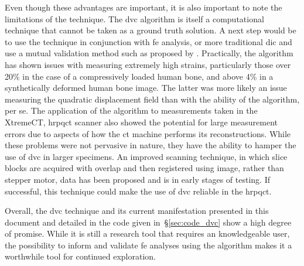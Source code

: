 Even though these advantages are important, it is also important to note the limitations of the technique.
The \ac{dvc} algorithm is itself a computational technique that cannot be taken as a ground truth solution.
A next step would be to use the technique in conjunction with \acl{fe} analysis, or more traditional \acl{dic} and use a mutual validation method such as proposed by \citet{bland_statistical_1986}.
Practically, the algorithm has shown issues with measuring extremely high strains, particularly those over 20\% in the case of a compressively loaded human bone, and above 4\% in a synthetically deformed human bone image.
The latter was more likely an issue measuring the quadratic displacement field than with the ability of the algorithm, per se.
The application of the algorithm to measurements taken in the XtremeCT, \ac{hrpqct} scanner also showed the potential for large measurement errors due to aspects of how the \ac{ct} machine performs its reconstructions.
While these problems were not pervasive in nature, they have the ability to hamper the use of \ac{dvc} in larger specimens.
An improved scanning technique, in which slice blocks are acquired with overlap and then registered using image, rather than stepper motor, data has been proposed and is in early stages of testing.
If successful, this technique could make the use of \ac{dvc} reliable in the \ac{hrpqct}.

Overall, the \ac{dvc} technique and its current manifestation presented in this document and detailed in the code given in~\S\ref{sec:code_dvc} show a high degree of promise.
While it is still a research tool that requires an knowledgeable user, the possibility to inform and validate \ac{fe} analyses using the algorithm makes it a worthwhile tool for continued exploration.